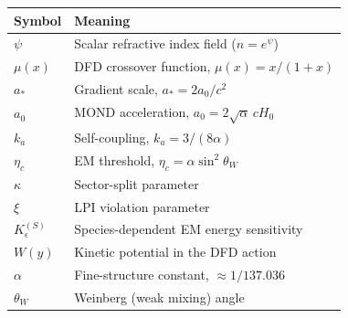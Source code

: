 \documentclass[11pt]{article}
\begin{document}
\begin{center}
\begin{tabular}{ll}
\toprule
\textbf{Symbol} & \textbf{Meaning} \\
\midrule
$\psi$ & Scalar refractive index field ($n = e^\psi$) \\
$\mu(x)$ & DFD crossover function, $\mu(x) = x/(1+x)$ \\
$a_*$ & Gradient scale, $a_* = 2a_0/c^2$ \\
$a_0$ & MOND acceleration, $a_0 = 2\sqrt{\alpha}\,cH_0$ \\
$k_a$ & Self-coupling, $k_a = 3/(8\alpha)$ \\
$\eta_c$ & EM threshold, $\eta_c = \alpha\sin^2\theta_W$ \\
$\kappa$ & Sector-split parameter \\
$\xi$ & LPI violation parameter \\
$K_\epsilon^{(S)}$ & Species-dependent EM energy sensitivity \\
$W(y)$ & Kinetic potential in the DFD action \\
$\alpha$ & Fine-structure constant, $\approx 1/137.036$ \\
$\theta_W$ & Weinberg (weak mixing) angle \\
\bottomrule
\end{tabular}
\end{center}
\end{document}

